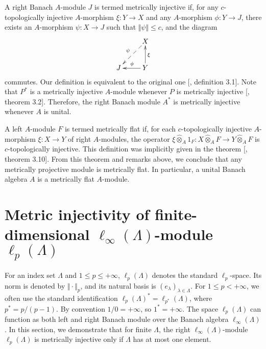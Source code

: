 \documentclass[12pt]{article}
\newcommand{\projmodtens}[1]{\mathbin{\widehat{\otimes}}_{#1}}
\begin{document}
A right Banach $A$-module $J$ is termed metrically injective if, for 
any $c$-topologically injective $A$-morphism $\xi:Y\to X$ and 
any $A$-morphism $\phi:Y\to J$, there exists an $A$-morphism $\psi:X\to J$ such 
that $\Vert\psi\Vert\leq c$, and the diagram
\[
    \xymatrix{
    & {X} \ar@{-->}[dl]_{\psi} \\
    {J} &{Y} \ar[l]_{\phi} \ar[u]_{\xi}}
\]
commutes. Our definition is equivalent to the original 
one [\cite{GravInjProjBanMod}, definition 3.1]. Note that $P^*$ is a metrically 
injective $A$-module whenever $P$ is metrically 
injective [\cite{GravInjProjBanMod}, theorem 3.2]. Therefore, the right Banach 
module $A^*$ is metrically injective whenever $A$ is unital.

A left $A$-module $F$ is termed metrically flat if, for each $c$-topologically 
injective $A$-morphism $\xi:X\to Y$ of right $A$-modules, the 
operator $\xi\projmodtens{A} 1_F:X\projmodtens{A} F\to Y\projmodtens{A} F$ 
is $c$-topologically injective. This definition was implicitly given in the 
theorem [\cite{GravInjProjBanMod}, theorem 3.10]. From this theorem and remarks 
above, we conclude that any metrically projective module is metrically flat. 
In particular, a unital Banach algebra $A$ is a metrically flat $A$-module.


\section{Metric injectivity of finite-dimensional 
\texorpdfstring{$\ell_\infty(\Lambda)$}{linftyLmbd}-module 
\texorpdfstring{$\ell_p(\Lambda)$}{lpLmbd}}
\label{MetrInjlinftynlpn}

For an index set $\Lambda$ and $1\leq p\leq +\infty$, $\ell_p(\Lambda)$ denotes 
the standard $\ell_p$-space. Its norm is denoted by $\Vert\cdot\Vert_p$, and 
its natural basis is $(e_\lambda)_{\lambda\in\Lambda}$. 
For $1\leq p<+\infty$, we often use the standard 
identification $\ell_p(\Lambda)^*=\ell_{p^*}(\Lambda)$, where $p^*=p/(p-1)$. 
By convention $1/0=+\infty$, so $1^*=+\infty$. The space $\ell_p(\Lambda)$ can 
function as both left and right Banach module over the Banach 
algebra $\ell_\infty(\Lambda)$. In this section, we demonstrate that for 
finite $\Lambda$, the right $\ell_\infty(\Lambda)$-module $\ell_p(\Lambda)$ is 
metrically injective only if $\Lambda$ has at most one element.
\end{document}
